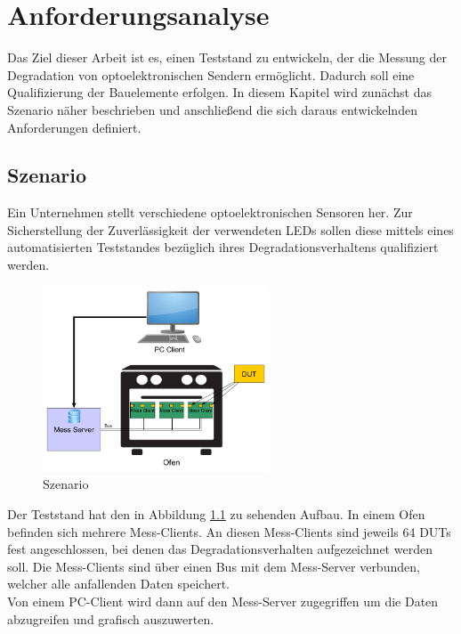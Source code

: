
\chapter{Anforderungsanalyse}
\label{chapter_Anforderungsanalyse}
Das Ziel dieser Arbeit ist es, einen Teststand zu entwickeln, der die Messung der Degradation von optoelektronischen Sendern ermöglicht. Dadurch soll eine Qualifizierung der Bauelemente erfolgen. In diesem Kapitel wird zunächst das Szenario näher beschrieben und anschließend die sich daraus entwickelnden Anforderungen definiert.

\section{Szenario}
Ein Unternehmen stellt verschiedene optoelektronischen Sensoren her. Zur Sicherstellung der Zuverlässigkeit der verwendeten \acp{LED} sollen diese mittels eines automatisierten Teststandes bezüglich ihres Degradationsverhaltens qualifiziert werden.


\begin{figure}[H]
\begin{center}
\includegraphics[width=0.6\textwidth]{img/general/Szenario.png}
\caption{Szenario}
\label{figure_Szenario}
\end{center}
\end{figure}

Der Teststand hat den in Abbildung \ref{figure_Szenario} zu sehenden Aufbau.
In einem Ofen befinden sich mehrere Mess-Clients. An diesen Mess-Clients sind jeweils 64 \acp{DUT} fest angeschlossen, bei denen das Degradationsverhalten aufgezeichnet werden soll.
Die Mess-Clients sind über einen Bus mit dem Mess-Server verbunden, welcher alle anfallenden Daten speichert.\\
Von einem PC-Client wird dann auf den Mess-Server zugegriffen um die Daten abzugreifen und grafisch auszuwerten.\\

